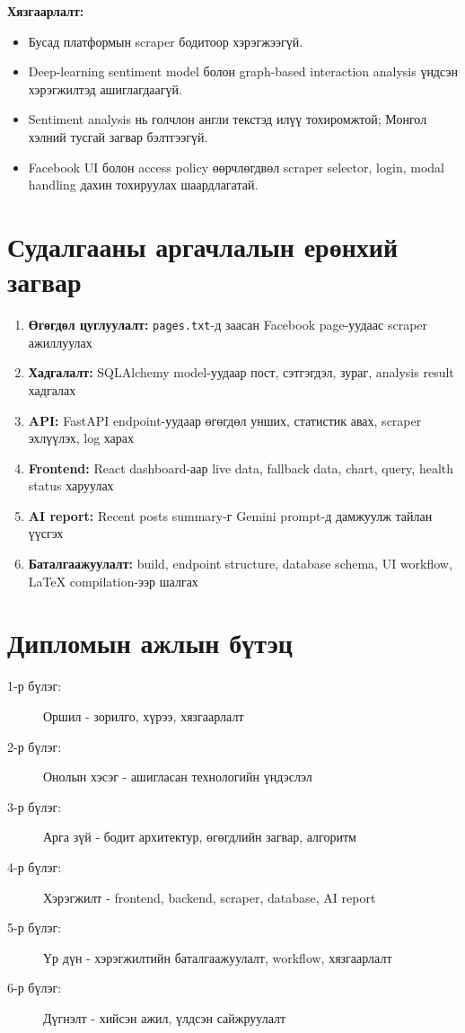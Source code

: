 \documentclass[
12pt,
oneside,
english,
onehalfspacing,
nolistspacing,
headsepline,
]{MUST-Thesis}
\begin{document}
\textbf{Хязгаарлалт:}
\begin{itemize}
    \item Бусад платформын scraper бодитоор хэрэгжээгүй.
    \item Deep-learning sentiment model болон graph-based interaction analysis үндсэн хэрэгжилтэд ашиглагдаагүй.
    \item Sentiment analysis нь голчлон англи текстэд илүү тохиромжтой; Монгол хэлний тусгай загвар бэлтгээгүй.
    \item Facebook UI болон access policy өөрчлөгдвөл scraper selector, login, modal handling дахин тохируулах шаардлагатай.
\end{itemize}

\section{Судалгааны аргачлалын ерөнхий загвар}

\begin{enumerate}
    \item \textbf{Өгөгдөл цуглуулалт:} \texttt{pages.txt}-д заасан Facebook page-уудаас scraper ажиллуулах
    \item \textbf{Хадгалалт:} SQLAlchemy model-уудаар пост, сэтгэгдэл, зураг, analysis result хадгалах
    \item \textbf{API:} FastAPI endpoint-уудаар өгөгдөл унших, статистик авах, scraper эхлүүлэх, log харах
    \item \textbf{Frontend:} React dashboard-аар live data, fallback data, chart, query, health status харуулах
    \item \textbf{AI report:} Recent posts summary-г Gemini prompt-д дамжуулж тайлан үүсгэх
    \item \textbf{Баталгаажуулалт:} build, endpoint structure, database schema, UI workflow, LaTeX compilation-ээр шалгах
\end{enumerate}

\section{Дипломын ажлын бүтэц}

\begin{description}
    \item[1-р бүлэг:] Оршил - зорилго, хүрээ, хязгаарлалт
    \item[2-р бүлэг:] Онолын хэсэг - ашигласан технологийн үндэслэл
    \item[3-р бүлэг:] Арга зүй - бодит архитектур, өгөгдлийн загвар, алгоритм
    \item[4-р бүлэг:] Хэрэгжилт - frontend, backend, scraper, database, AI report
    \item[5-р бүлэг:] Үр дүн - хэрэгжилтийн баталгаажуулалт, workflow, хязгаарлалт
    \item[6-р бүлэг:] Дүгнэлт - хийсэн ажил, үлдсэн сайжруулалт
\end{description}
\end{document}
